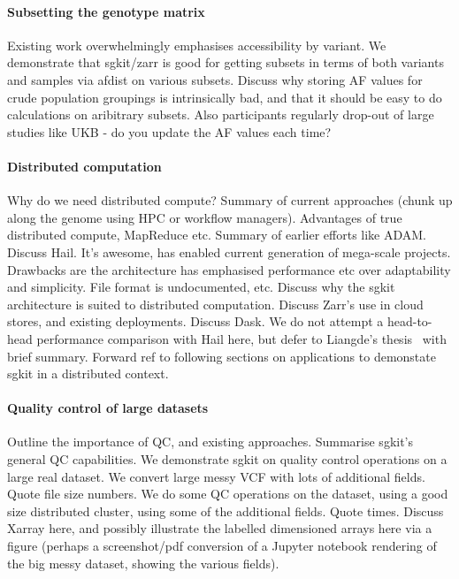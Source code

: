 \documentclass[a4paper,num-refs]{oup-contemporary}
\begin{document}
\paragraph{Subsetting the genotype matrix}
Existing work overwhelmingly emphasises accessibility by variant.
We demonstrate that sgkit/zarr is good for getting subsets
in terms of both variants and samples via afdist on various subsets.
Discuss why storing AF values for crude population groupings is
intrinsically bad, and that it should be easy to do calculations
on aribitrary subsets. Also participants regularly drop-out of
large studies like UKB - do you update the AF values each time?

\paragraph{Distributed computation}
Why do we need distributed compute? Summary of current
approaches (chunk up along the genome using HPC or workflow
managers). Advantages of true distributed compute, MapReduce
etc. Summary of earlier efforts like ADAM.
Discuss Hail. It's awesome, has enabled current
generation of mega-scale projects. Drawbacks are the
architecture has emphasised performance etc over adaptability
and simplicity. File format is undocumented, etc.
Discuss why the sgkit architecture is suited to distributed
computation. Discuss Zarr's use in cloud stores, and existing
deployments. Discuss Dask.
We do not attempt a head-to-head performance comparison with
Hail here, but defer to Liangde's thesis~\citep{li2022efficient}
with brief summary.
Forward ref to following sections on applications to demonstate
sgkit in a distributed context.

\paragraph{Quality control of large datasets}
Outline the importance of QC, and existing approaches.
Summarise sgkit's general QC capabilities.
We demonstrate sgkit on quality control operations on a large
real dataset. We convert large messy VCF with lots of additional
fields. Quote file size numbers. We do some QC operations on
the dataset, using a good size distributed cluster, using
some of the additional fields. Quote times. Discuss Xarray
here, and possibly illustrate the labelled dimensioned arrays
here via a figure (perhaps a screenshot/pdf conversion of
a Jupyter notebook rendering of the big messy dataset,
showing the various fields).
\end{document}
